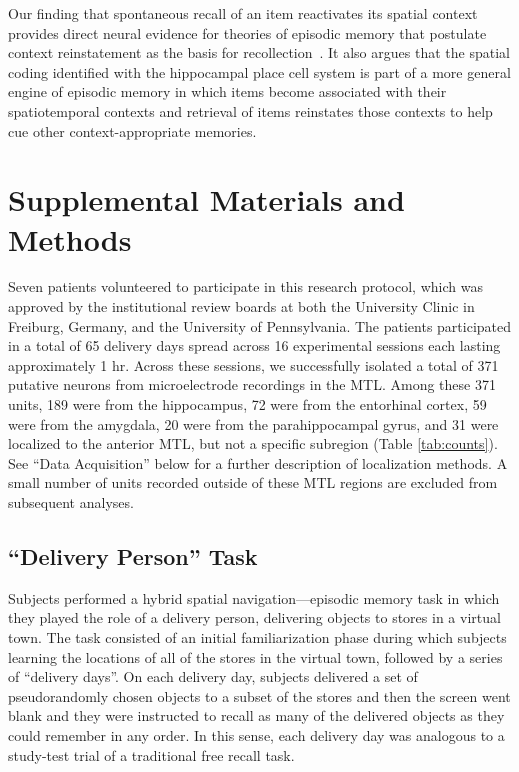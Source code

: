 Our finding that spontaneous recall of an item reactivates its spatial context provides direct neural evidence for theories of episodic memory that postulate context reinstatement as the basis for recollection~\cite{PolyKaha08,PolyEtal09}.  It also argues that the spatial coding identified with  the hippocampal place cell system is part of a more general engine of episodic memory in which items become associated with their spatiotemporal contexts and retrieval of items reinstates those contexts to help cue other context-appropriate memories.


\section{Supplemental Materials and Methods}

Seven patients volunteered to participate in this research protocol, which was approved by the institutional review boards at both the University Clinic in Freiburg, Germany, and the University of Pennsylvania.  The patients participated in a total of 65 delivery days spread across 16 experimental sessions each lasting approximately 1 hr.   Across these sessions, we successfully isolated a total of 371 putative neurons from microelectrode recordings in the MTL.  Among these 371 units, 189 were from the hippocampus, 72 were from the entorhinal cortex, 59 were from the amygdala, 20 were from the parahippocampal gyrus, and 31 were localized to the anterior MTL, but not a specific subregion (Table \ref{tab:counts}). See ``Data Acquisition'' below for a further description of localization methods.  A small number of units recorded outside of these MTL regions are excluded from subsequent analyses.

\subsection*{``Delivery Person'' Task}

Subjects performed a hybrid spatial navigation---episodic memory task in which they played the role of a delivery person, delivering objects to stores in a virtual town.  The task consisted of an initial familiarization phase during which subjects learning the locations of all of the stores in the virtual town, followed by a series of ``delivery days''.  On each delivery day, subjects delivered a set of pseudorandomly chosen objects to a subset of the stores and then the screen went blank and they were instructed to recall as many of the delivered objects as they could remember in any order.  In this sense, each delivery day was analogous to a study-test trial of a traditional free recall task.

